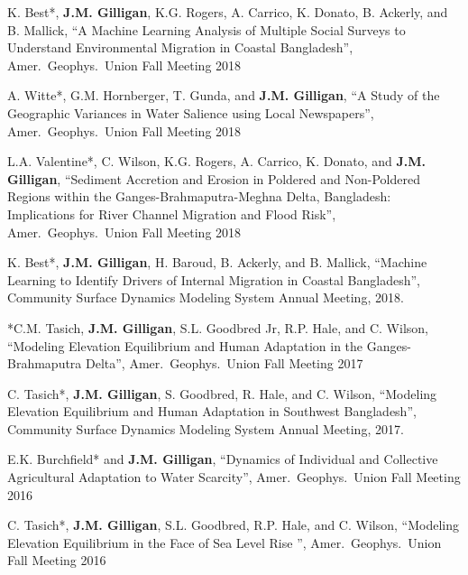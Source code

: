 %
%
    \item 
    K. Best*, \textbf{J.M. Gilligan}, K.G. Rogers, A. Carrico, K. Donato, B. Ackerly, and B. Mallick,
    \enquote{A Machine Learning Analysis of Multiple Social Surveys to Understand Environmental Migration in Coastal Bangladesh},
    Amer.\ Geophys.\ Union Fall Meeting 2018

    \item 
    A. Witte*, G.M. Hornberger, T. Gunda, and \textbf{J.M. Gilligan},
    \enquote{A Study of the Geographic Variances in Water Salience using Local Newspapers},
    Amer.\ Geophys.\ Union Fall Meeting 2018
    
    \item 
    L.A. Valentine*,  C. Wilson, K.G. Rogers, A. Carrico, K. Donato, and \textbf{J.M. Gilligan},
    \enquote{Sediment Accretion and Erosion in Poldered and Non-Poldered Regions within the 
        Ganges-Brahmaputra-Meghna Delta, Bangladesh: Implications for River Channel Migration and Flood Risk},
    Amer.\ Geophys.\ Union Fall Meeting 2018
    
    \item 
    K. Best*, \textbf{J.M. Gilligan}, H. Baroud, B. Ackerly, and B. Mallick,
    \enquote{Machine Learning to Identify Drivers of Internal Migration in Coastal Bangladesh},
    Community Surface Dynamics Modeling System Annual Meeting, 2018.
    
    \item 
    *C.M. Tasich, \textbf{J.M. Gilligan}, S.L. Goodbred Jr, R.P. Hale, and C. Wilson,
    \enquote{Modeling Elevation Equilibrium and Human Adaptation in the Ganges-Brahmaputra Delta},
    Amer.\ Geophys.\ Union Fall Meeting 2017
    
    \item 
    C. Tasich*, \textbf{J.M. Gilligan}, S. Goodbred, R. Hale, and C. Wilson,
    \enquote{Modeling Elevation Equilibrium and Human Adaptation in Southwest Bangladesh},
    Community Surface Dynamics Modeling System Annual Meeting, 2017.

    \item 
    E.K. Burchfield* and \textbf{J.M. Gilligan},
    \enquote{Dynamics of Individual and Collective Agricultural Adaptation to Water Scarcity},
    Amer.\ Geophys.\ Union Fall Meeting 2016
    
    \item 
    C. Tasich*, \textbf{J.M. Gilligan}, S.L. Goodbred, R.P. Hale, and C. Wilson,
    \enquote{Modeling Elevation Equilibrium in the Face of Sea Level Rise },
    Amer.\ Geophys.\ Union Fall Meeting 2016


